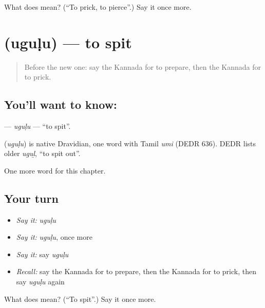 \begin{tcolorbox}[breakable,colback=teal!4,colframe=teal!35!black,title={Before you move on}]
What does  mean? (\textquotedblleft{}To prick, to pierce\textquotedblright{}.) Say it once more.
\end{tcolorbox}
\section[\texorpdfstring{\kn{ಉಗುಳು} (uguḷu)}{ಉಗುಳು (uguḷu)}]{ (uguḷu) — to spit}

\label{lesson:KA-C279-ugulu}



\begin{quote}
Before the new one: say the Kannada for to prepare, then the Kannada for to prick.
\end{quote}

\subsection*{You'll want to know: }
\textbf{} — \emph{uguḷu} — \textquotedblleft{}to spit\textquotedblright{}.

\begin{cousinweb}
\textbf{} (\emph{uguḷu}) is native Dravidian, one word with Tamil \emph{umi} (DEDR 636). DEDR lists older \emph{uguḻ}, \textquotedblleft{}to spit out\textquotedblright{}.
\end{cousinweb}

\begin{grammarlens}[title={What you've built}]
One more word for this chapter.
\end{grammarlens}

\subsection*{Your turn}
\begin{itemize}
\raggedright
  \item \emph{Say it:} \emph{uguḷu}
  \item \emph{Say it:} \emph{uguḷu}, once more
  \item \emph{Say it:} say \emph{uguḷu}
  \item \emph{Recall:} say the Kannada for to prepare, then the Kannada for to prick, then say \emph{uguḷu} again
\end{itemize}

\begin{tcolorbox}[breakable,colback=teal!4,colframe=teal!35!black,title={Before you move on}]
What does  mean? (\textquotedblleft{}To spit\textquotedblright{}.) Say it once more.
\end{tcolorbox}
